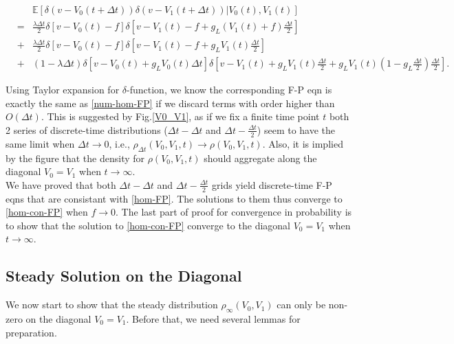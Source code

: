 \documentclass[10pt]{article}
\begin{document}
\begin{multicols}{2}
  \begin{eqnarray}
&&\mathbb{E}[\delta(v-V_0(t+\Delta t))\delta(v-V_1(t+\Delta t))|V_0(t),V_1(t)] \nonumber\\
 &=& \frac{\lambda\Delta t}{2} \delta[v-V_0(t)-f]\delta[v-V_1(t)-f+g_L(V_1(t)+f)\frac{\Delta t}{2}] \nonumber\\
 &+& \frac{\lambda\Delta t}{2} \delta[v-V_0(t)-f]\delta[v-V_1(t)-f+g_LV_1(t)\frac{\Delta t}{2}] \nonumber\\
\label{Exp2}
&+&(1-\lambda\Delta t) \delta[v-V_0(t)+g_LV_0(t)\Delta t]\delta[v-V_1(t)+g_LV_1(t)\frac{\Delta t}{2}+g_LV_1(t)(1-g_L\frac{\Delta t}{2})\frac{\Delta t}{2}].
\end{eqnarray}

Using Taylor expansion for $\delta$-function, we know the corresponding F-P eqn is exactly the same as \ref{num-hom-FP} if we discard terms with order higher than $O(\Delta t)$. This is suggested by Fig.\ref{V0_V1}, as if we fix a finite time point $t$ both 2 series of discrete-time distributions ($\Delta t-\Delta t$ and $\Delta t-\frac{\Delta t}{2}$) seem to have the same limit when $\Delta t\rightarrow 0$, i.e., $\rho_{\Delta t}(V_0,V_1,t)\rightarrow \rho(V_0,V_1,t)$. Also, it is implied by the figure that the density for $\rho(V_0,V_1,t)$ should aggregate along the diagonal $V_0=V_1$ when $t\rightarrow \infty$.\\
\indent
We have proved that both $\Delta t-\Delta t$ and $\Delta t-\frac{\Delta t}{2}$ grids yield discrete-time F-P eqns that are consistant with \ref{hom-FP}. The solutions to them thus converge to \ref{hom-con-FP} when $f\rightarrow 0$. The last part of proof for convergence in probability is to show that the solution to \ref{hom-con-FP} converge to the diagonal $V_0=V_1$ when $t\rightarrow\infty$.


\subsection*{Steady Solution on the Diagonal}
We now start to show that the steady distribution $\rho_{\infty}(V_0,V_1)$ can only be non-zero on the diagonal $V_0=V_1$. Before that, we need several lemmas for preparation. 


\end{multicols}
\end{document}
